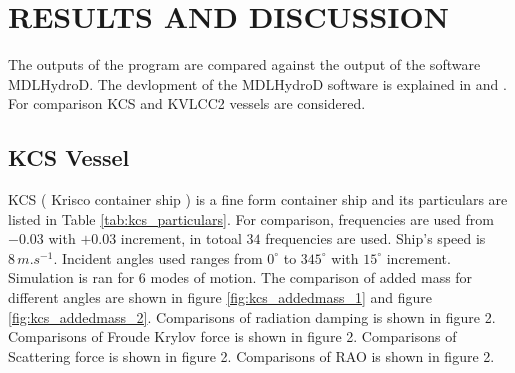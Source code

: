\chapter{RESULTS AND DISCUSSION}
The outputs of the program are compared against the output of the software MDLHydroD. The devlopment of the 
MDLHydroD software is explained in \cite{guha2013development} and \cite{guha2015estimation}.
For comparison KCS and KVLCC2 vessels are considered. 

\section{KCS Vessel}
KCS ( Krisco container ship ) is a fine form container ship and its particulars are listed in Table \ref{tab:kcs_particulars}. 
For comparison, frequencies are used from
$-0.03$ with $+0.03$ increment, in totoal $34$ frequencies are used. Ship's speed is $8\,\si{m.s^{-1}}$. Incident angles used 
ranges from $0^{\circ}$ to $345^{\circ}$ with $15^{\circ}$ increment. Simulation is ran for 6 modes of motion.  
The comparison of added mass for different angles are shown in figure \ref{fig:kcs_addedmass_1} and figure \ref{fig:kcs_addedmass_2}.
Comparisons of radiation damping is shown in figure 2. Comparisons of Froude Krylov force is shown in figure 2.
Comparisons of Scattering force is shown in figure 2. Comparisons of RAO is shown in figure 2.

\begin{table}[tbp]
    \caption[Table]{KCS principal particulars\label{tab:kcs_particulars}}
   
\end{table}

